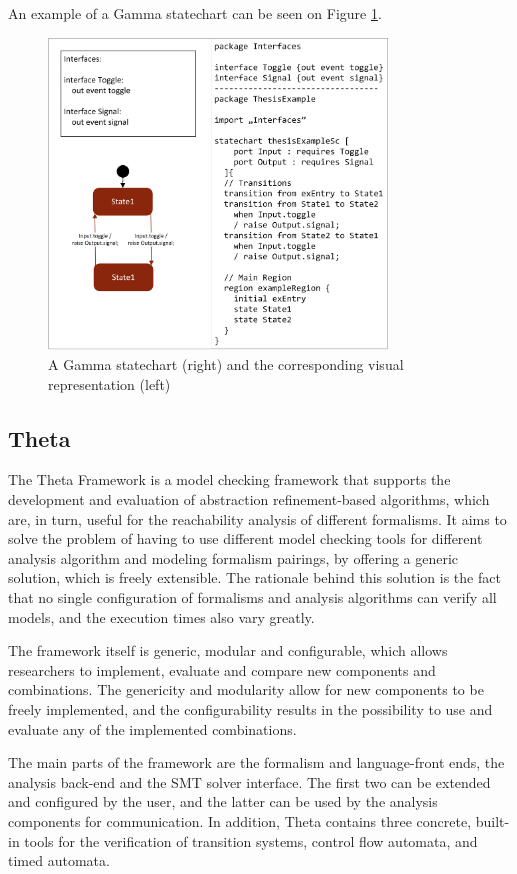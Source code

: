 An example of a Gamma statechart can be seen on Figure \ref{fig:gammaExample}.

\begin{figure}[!ht]
	\centering
	\includegraphics[width=90mm, keepaspectratio]{figures/gammaExample.png}
	\caption{A Gamma statechart (right) and the corresponding visual representation (left)}
	\label{fig:gammaExample}
\end{figure}

\newpage
\subsection{Theta} \label{subsection_background_target_theta}
The Theta Framework \cite{ThetaToolPaper} is a model checking framework that supports the development and evaluation of abstraction refinement-based algorithms, which are, in turn, useful for the reachability analysis of different formalisms. It aims to solve the problem of having to use different model checking tools for different analysis algorithm and modeling formalism pairings, by offering a generic solution, which is freely extensible. The rationale behind this solution is the fact that no single configuration of formalisms and analysis algorithms can verify all models, and the execution times also vary greatly.

The framework itself is generic, modular and configurable, which allows researchers to implement, evaluate and compare new components and combinations. The genericity and modularity allow for new components to be freely implemented, and the configurability results in the possibility to use and evaluate any of the implemented combinations. 

The main parts of the framework are the formalism and language-front ends, the analysis back-end and the SMT solver interface. The first two can be extended and configured by the user, and the latter can be used by the analysis components for communication. In addition, Theta contains three concrete, built-in tools for the verification of transition systems, control flow automata, and timed automata. 

